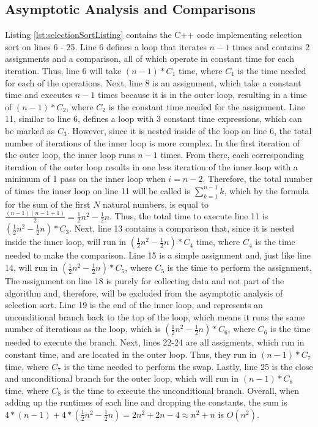 \documentclass[letterpaper, 10pt,DIV=13]{scrartcl}
\numberwithin{equation}{section} %
\numberwithin{figure}{section} %
\numberwithin{table}{section} %
\begin{document}
\subsection{Asymptotic Analysis and Comparisons}\label{selectionAnalysis}
Listing \ref{lst:selectionSortListing} contains the C++ code implementing selection sort on lines 6 - 25. Line 6 defines a loop that iterates $n - 1$ times and contains 2 assignments and a comparison, all of which operate in constant time for each iteration. Thus, line 6 will take $(n - 1) * C_{1}$ time, where $C_{1}$ is the time needed for each of the operations. Next, line 8 is an assignment, which take a constant time and executes $n - 1$ times because it is in the outer loop, resulting in a time of $(n - 1) * C_{2}$, where $C_{2}$ is the constant time needed for the assignment. Line 11, similar to line 6, defines a loop with 3 constant time expressions, which can be marked as $C_{3}$. However, since it is nested inside of the loop on line 6, the total number of iterations of the inner loop is more complex. In the first iteration of the outer loop, the inner loop runs $n - 1$ times. From there, each corresponding iteration of the outer loop results in one less iteration of the inner loop with a minimum of 1 pass on the inner loop when $i = n - 2$. Therefore, the total number of times the inner loop on line 11 will be called is $\sum_{k = 1} ^{n - 1} k$, which by the formula for the sum of the first $N$ natural numbers, is equal to $\frac{(n - 1)(n - 1 + 1)}{2} = \frac{1}{2}n^2 - \frac{1}{2}n$. Thus, the total time to execute line 11 is $(\frac{1}{2}n^2 - \frac{1}{2}n) * C_{3}$. Next, line 13 contains a comparison that, since it is nested inside the inner loop, will run in $(\frac{1}{2}n^2 - \frac{1}{2}n) * C_{4}$ time, where $C_{4}$ is the time needed to make the comparison. Line 15 is a simple assignment and, just like line 14, will run in $(\frac{1}{2}n^2 - \frac{1}{2}n) * C_{5}$, where $C_{5}$ is the time to perform the assignment. The assignment on line 18 is purely for collecting data and not part of the algorithm and, therefore, will be excluded from the asymptotic analysis of selection sort. Line 19 is the end of the inner loop, and represents an unconditional branch back to the top of the loop, which means it runs the same number of iterations as the loop, which is $(\frac{1}{2}n^2 - \frac{1}{2}n) * C_{6}$, where $C_{6}$ is the time needed to execute the branch. Next, lines 22-24 are all assigments, which run in constant time, and are located in the outer loop. Thus, they run in $(n - 1) * C_{7}$ time, where $C_{7}$ is the time needed to perform the swap. Lastly, line 25 is the close and unconditional branch for the outer loop, which will run in $(n - 1) * C_{8}$ time, where $C_{8}$ is the time to execute the unconditional branch. Overall, when adding up the runtimes of each line and dropping the constants, the sum is $4 * (n - 1) + 4 * (\frac{1}{2}n^2 - \frac{1}{2}n) = 2n^2 + 2n - 4 \approx n^2 + n$ is $O(n^2)$.
\end{document}
